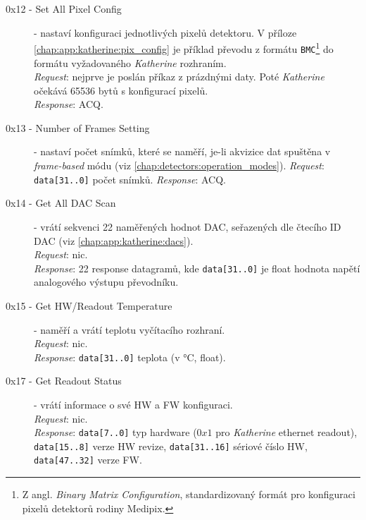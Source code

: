 \begin{description}

    \item[0x12 - Set All Pixel Config] - nastaví konfiguraci jednotlivých pixelů detektoru. V příloze \ref{chap:app:katherine:pix_config} je příklad převodu z formátu \texttt{BMC}\footnote{Z angl. \textit{Binary Matrix Configuration}, standardizovaný formát pro konfiguraci pixelů detektorů rodiny Medipix.} do formátu vyžadovaného \textit{Katherine} rozhraním.
    \\\textit{Request}: nejprve je poslán příkaz z prázdnými daty. Poté \textit{Katherine} očekává 65536 bytů s konfigurací pixelů.
    \\\textit{Response}: ACQ.

    \item[0x13 - Number of Frames Setting] - nastaví počet snímků, které se naměří, je-li akvizice dat spuštěna v \textit{frame-based} módu (viz \ref{chap:detectors:operation_modes}).
    \textit{Request}: \texttt{data[31..0]} počet snímků.
    \textit{Response}: ACQ.

    \item[0x14 - Get All DAC Scan] - vrátí sekvenci 22 naměřených hodnot DAC, seřazených dle čtecího ID DAC (viz \ref{chap:app:katherine:dacs}).
    \\\textit{Request}: nic.
    \\\textit{Response}: 22 response datagramů, kde \texttt{data[31..0]} je float hodnota napětí analogového výstupu převodníku.

    \item[0x15 - Get HW/Readout Temperature] - naměří a vrátí teplotu vyčítacího rozhraní.
    \\\textit{Request}: nic.
    \\\textit{Response}: \texttt{data[31..0]} teplota (v °C, float).

    
    \item[0x17 - Get Readout Status] - vrátí informace o své HW a FW konfiguraci.
    \\\textit{Request}: nic.
    \\\textit{Response}: \texttt{data[7..0]} typ hardware ($0x1$ pro \textit{Katherine} ethernet readout),\\\texttt{data[15..8]} verze HW revize, \texttt{data[31..16]} sériové číslo HW, \texttt{data[47..32]} verze FW.


\end{description}
